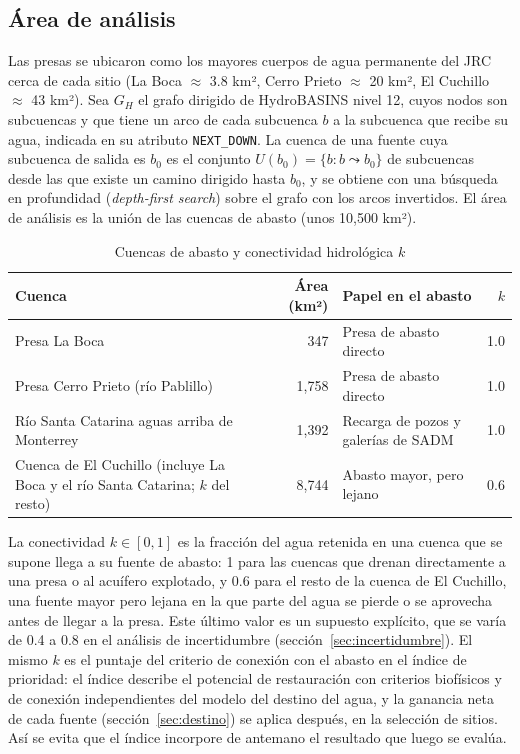 \subsection{Área de análisis}

Las presas se ubicaron como los mayores cuerpos de agua permanente del JRC cerca de cada sitio (La Boca $\approx$ 3.8 km², Cerro Prieto $\approx$ 20 km², El Cuchillo $\approx$ 43 km²). Sea $G_H$ el grafo dirigido de HydroBASINS nivel 12, cuyos nodos son subcuencas y que tiene un arco de cada subcuenca $b$ a la subcuenca que recibe su agua, indicada en su atributo \texttt{NEXT\_DOWN}. La cuenca de una fuente cuya subcuenca de salida es $b_0$ es el conjunto $U(b_0) = \{b : b \leadsto b_0\}$ de subcuencas desde las que existe un camino dirigido hasta $b_0$, y se obtiene con una búsqueda en profundidad (\emph{depth-first search}) sobre el grafo con los arcos invertidos. El área de análisis es la unión de las cuencas de abasto (unos 10,500 km²).

\begin{table}[H]\centering\small
\caption{Cuencas de abasto y conectividad hidrológica $k$}\label{tab:cuencas}
\begin{tabularx}{\linewidth}{Xrlr}
\toprule
Cuenca & Área (km²) & Papel en el abasto & $k$ \\
\midrule
Presa La Boca & 347 & Presa de abasto directo & 1.0 \\
Presa Cerro Prieto (río Pablillo) & 1,758 & Presa de abasto directo & 1.0 \\
Río Santa Catarina aguas arriba de Monterrey & 1,392 & Recarga de pozos y galerías de SADM & 1.0 \\
Cuenca de El Cuchillo (incluye La Boca y el río Santa Catarina; $k$ del resto) & 8,744 & Abasto mayor, pero lejano & 0.6 \\
\bottomrule
\end{tabularx}
\end{table}

La conectividad $k\in[0,1]$ es la fracción del agua retenida en una cuenca que se supone llega a su fuente de abasto: 1 para las cuencas que drenan directamente a una presa o al acuífero explotado, y 0.6 para el resto de la cuenca de El Cuchillo, una fuente mayor pero lejana en la que parte del agua se pierde o se aprovecha antes de llegar a la presa. Este último valor es un supuesto explícito, que se varía de 0.4 a 0.8 en el análisis de incertidumbre (sección~\ref{sec:incertidumbre}). El mismo $k$ es el puntaje del criterio de conexión con el abasto en el índice de prioridad: el índice describe el potencial de restauración con criterios biofísicos y de conexión independientes del modelo del destino del agua, y la ganancia neta de cada fuente (sección~\ref{sec:destino}) se aplica después, en la selección de sitios. Así se evita que el índice incorpore de antemano el resultado que luego se evalúa.

